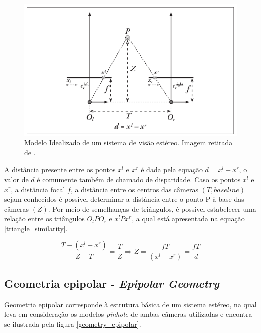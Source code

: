 \begin{figure}[H]
 	\centering
 	\includegraphics[scale=0.35]{./Resources/bradski/stereo_image_geometric_model.png}
 	\caption{Modelo Idealizado de um sistema de visão estéreo. Imagem retirada de \cite{Bradski2008}.}
 	\label{stereo_image_geometric_model}
\end{figure}

A distância presente entre os pontos $x^l$ e $x^r$ é dada pela equação $d = x^l - x^r$, o valor de $d$ é comumente também de chamado de disparidade. Caso os pontos $x^l$ e $x^r$, a distância focal $f$, a distância entre os centros das câmeras $(T,baseline)$ sejam conhecidos é possível determinar a distância entre o ponto P à base das câmeras $(Z)$. Por meio de semelhanças de triângulos, é possível estabelecer uma relação entre os triângulos $O_lPO_r$ e $x^lPx^r$, a qual está apresentada na equação \ref{triangle_similarity}.

\begin{equation}
\label{triangle_similarity}
\frac{T - (x^l-x^r)}{Z-T} = \frac{T}{Z} \Rightarrow Z = \frac{fT}{(x^l-x^r)} = \frac{fT}{d}
\end{equation}


\subsection{Geometria epipolar - \textit{Epipolar Geometry}}

Geometria epipolar corresponde à estrutura básica de um sistema estéreo, na qual leva em consideração os modelos \textit{pinhole} de ambas câmeras utilizadas e encontra-se ilustrada pela figura \ref{geometry_epipolar}. 

